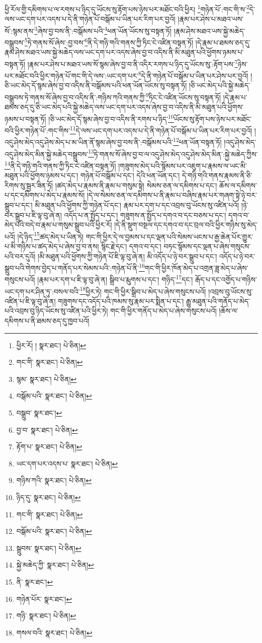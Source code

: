 ཕྱི་རོལ་གྱི་དམིགས་པ་ལ་རགས་པ་ཉིད་དུ་ཡོངས་སུ་རྟོག་པས་ཉེས་པར་མཐོང་བའི་ཕྱིར། \footnote{ཕྱིར་རོ། །   སྣར་ཐང་།  པེ་ཅིན། }གཉེན་པོ་:གང་གི་ས་\footnote{གང་གི་  སྣར་ཐང་།  པེ་ཅིན། }དེ་ལས་ཡང་དག་པར་འདས་པ་དེ་ནི་གཉེན་པོ་བསྒོམ་པ་ཡིན་པར་རིག་པར་བྱའོ། །རྣམ་པར་ཤེས་པ་མཐའ་ཡས་སོ་:སྙམ་ནས་\footnote{སྙམ་  སྣར་ཐང་།  པེ་ཅིན། }ཞེས་བྱ་བས་ནི་:བསྒོམས་པའི་\footnote{བསྒོམ་པའི་  སྣར་ཐང་།  པེ་ཅིན། }ཕན་ཡོན་ཡོངས་སུ་བསྟན་ཏོ། །རྣམ་ཤེས་མཐའ་ཡས་སྐྱེ་མཆེད་བསྒྲུབས་\footnote{བསྒྲུབ་  སྣར་ཐང་། }ཏེ་གནས་སོ་ཞེས་:བྱ་བས་\footnote{བྱ་བ་  སྣར་ཐང་།  པེ་ཅིན། }ནི་དེ་གཉི་གའི་གནས་ཀྱི་ཏིང་ངེ་འཛིན་བསྟན་ཏོ། །དེ་རྣམ་པ་ཐམས་ཅད་དུ་རྣམ་ཤེས་མཐའ་ཡས་སྐྱེ་མཆེད་ལས་ཡང་དག་པར་འདས་ཞེས་བྱ་བ་འདིས་ནི་མི་མཐུན་པའི་ཕྱོགས་ཉམས་པ་བསྟན་ཏོ། །རྣམ་པར་ཤེས་པ་མཐའ་ཡས་སོ་སྙམ་ཞེས་བྱ་བ་ནི་འདིར་རགས་པ་ཉིད་དུ་ཡོངས་སུ་:རྟོག་པས་\footnote{རྟོག་པ་  སྣར་ཐང་།  པེ་ཅིན། }ཉེས་པར་མཐོང་བའི་ཕྱིར་གཉེན་པོ་གང་གི་དེ་ལས་:ཡང་དག་པར་\footnote{ཡང་དག་པར་འདས་པ་  སྣར་ཐང་།  པེ་ཅིན། }དེ་ནི་གཉེན་པོ་བསྒོམ་པ་ཡིན་པར་ཤེས་པར་བྱའོ། །ཅི་ཡང་མེད་དོ་སྙམ་ཞེས་བྱ་བ་འདིས་ནི་བསྒོམས་པའི་ཕན་ཡོན་ཡོངས་སུ་བསྟན་ཏོ། །ཅི་ཡང་མེད་པའི་སྐྱེ་མཆེད་བསྒྲུབས་ཏེ་གནས་སོ་ཞེས་བྱ་བ་འདིས་ནི་:གཉིས་ཀའི་གནས་ཀྱི་\footnote{གཉིས་ཀའི་  སྣར་ཐང་།  པེ་ཅིན། }ཏིང་ངེ་འཛིན་ཡོངས་སུ་བསྟན་ཏོ། །དེ་རྣམ་པ་ཐམས་ཅད་དུ་ཅི་ཡང་མེད་པའི་སྐྱེ་མཆེད་ལས་ཡང་དག་པར་འདས་ཞེས་བྱ་བ་འདིས་ནི་མི་མཐུན་པའི་ཕྱོགས་ཉམས་པ་བསྟན་ཏོ། །ཅི་ཡང་མེད་དོ་སྙམ་ཞེས་བྱ་བ་འདིས་ནི་རགས་པ་ཉིད་\footnote{ཉིད་དུ་  སྣར་ཐང་།  པེ་ཅིན། }ཡོངས་སུ་རྟོག་པས་ཉེས་པར་མཐོང་བའི་ཕྱིར་གཉེན་པོ་:གང་གིས་\footnote{གང་གི་  སྣར་ཐང་།  པེ་ཅིན། }དེ་ལས་ཡང་དག་པར་འདས་པ་དེ་ནི་གཉེན་པོ་བསྒོམ་པ་ཡིན་པར་རིག་པར་བྱའོ། །འདུ་ཤེས་མེད་འདུ་ཤེས་མེད་པ་མ་ཡིན་ནོ་སྙམ་ཞེས་བྱ་བས་ནི་:བསྒོམས་པའི་\footnote{བསྒོམ་པའི་  སྣར་ཐང་།  པེ་ཅིན། }ཕན་ཡོན་བསྟན་ཏོ། །འདུ་ཤེས་མེད་འདུ་ཤེས་མེད་མིན་སྐྱེ་མཆེད་བསྒྲུབས་\footnote{སྒྲུབས་  སྣར་ཐང་།  པེ་ཅིན། }ཏེ་གནས་སོ་ཞེས་བྱ་བ་ལ་འདུ་ཤེས་མེད་འདུ་ཤེས་མེད་མིན་:སྐྱེ་མཆེད་ཀྱིས་\footnote{སྐྱེ་མཆེད་ཀྱི་  སྣར་ཐང་།  པེ་ཅིན། }ནི་དེ་གཉི་གའི་གནས་ཀྱི་ཏིང་ངེ་འཛིན་བསྟན་ཏོ། །གཟུགས་མེད་པའི་སྙོམས་པར་འཇུག་པ་རྣམས་ལ་ཡང་མི་མཐུན་པའི་ཕྱོགས་ཉམས་པ་དང་། གཉེན་པོ་བསྒོམ་པ་དང་། དེའི་ཕན་ཡོན་དང་། དེ་གཉི་གའི་གནས་རྣམས་ནི་ཅི་རིགས་སུ་སྦྱར་ཟིན་ཏོ། །ཚད་མེད་པ་རྣམས་ནི་རྣམ་པ་གསུམ་སྟེ། སེམས་ཅན་ལ་དམིགས་པ་དང་། ཆོས་ལ་དམིགས་པ་དང་དམིགས་པ་མེད་པ་རྣམས་སོ། །དེ་ལ་སེམས་ཅན་ལ་དམིགས་པ་ནི་རྣམ་པ་བཞིས་རྣམ་པར་གཞག་སྟེ་ཉེ་བར་སྒྲུབ་པ་དང་། མི་མཐུན་པའི་ཕྱོགས་ཀྱི་གཉེན་པོ་དང་། རྣམ་པར་དག་པ་དང་འབྲས་བུ་ཡོངས་སུ་འཛིན་པའོ། །ཉེ་བར་སྒྲུབ་པ་ཇི་ལྟ་བུ་ཞེ་ན། འདོད་པ་ན་སྤྱོད་པ་དང་། གཟུགས་ན་སྤྱོད་པ་དགའ་བ་དང་བཅས་པ་དང་། དགའ་བ་མེད་པའི་བདེ་བ་རྣམ་པ་གསུམ་སྒྲུབ་པའི་ཕྱིར་རོ། །དེ་ནི་སྡུག་བསྔལ་དང་དགའ་བ་དང་བྲལ་བའི་ཕྱིར་གཉིས་སུ་མེད་པའོ། །དེ་ཉིད་\footnote{ནི་  སྣར་ཐང་། }ཚད་མེད་པ་ཡིན་ཏེ། གང་གི་ཕྱིར་དེ་ལ་བྱམས་པ་དང་ལྡན་པའི་སེམས་ཡངས་པ་རྒྱ་ཆེན་པོར་གྱུར་པ་མི་གཉིས་པ་ཚད་མེད་པ་ཞེས་བྱ་བ་ནས། སྙིང་རྗེ་དང་། དགའ་བ་དང་། བཏང་སྙོམས་དང་ལྡན་པ་ཞེས་གསུངས་པའི་བར་དུའོ། །མི་མཐུན་པའི་ཕྱོགས་ཀྱི་གཉེན་པོ་ཇི་ལྟ་བུ་ཞེ་ན། མི་འདོད་པ་ཉེ་བར་སྒྲུབ་པ་དང་། འདོད་པ་ཉེ་བར་སྒྲུབ་པའི་གེགས་བྱེད་པ་གནོད་པར་སེམས་པའི་:གཉེན་པོ་ནི་\footnote{གཉེན་པོར་  སྣར་ཐང་། }གང་གི་ཕྱིར་ཁོན་མེད་པ་འགྲན་ཟླ་མེད་པ་ཞེས་གསུངས་པའོ། །རྣམ་པར་དག་པ་ཇི་ལྟ་བུ་ཞེ་ན། སྒྲིབ་པ་རྨུགས་པ་དང་། གཉིད་\footnote{གཉི་  སྣར་ཐང་།  པེ་ཅིན། }དང་། རྒོད་པ་དང་འགྱོད་པ་གཉིས་ཡང་དག་པར་ཤིན་ཏུ་:བསལ་བའི་\footnote{གསལ་བའི་  སྣར་ཐང་།  པེ་ཅིན། }ཕྱིར་ཏེ། གང་གི་ཕྱིར་སྒྲིབ་པ་མེད་པ་ཞེས་གསུངས་པའོ། །འབྲས་བུ་ཡོངས་སུ་འཛིན་པ་ཇི་ལྟ་བུ་ཞེ་ན། གཟུགས་དང་འདོད་པའི་ཁམས་སུ་རྣམ་པར་སྨིན་པ་དང་། རྒྱུ་མཐུན་པའི་གནོད་པ་མེད་པའི་འབྲས་བུ་ཉིད་ཡོངས་སུ་འཛིན་པའི་ཕྱིར་ཏེ། གང་གི་ཕྱིར་གནོད་པ་མེད་པ་ཞེས་གསུངས་པའོ། །ཆོས་ལ་དམིགས་པ་ནི་ཐམས་ཅད་དུ་ཁྱབ་པའོ། 